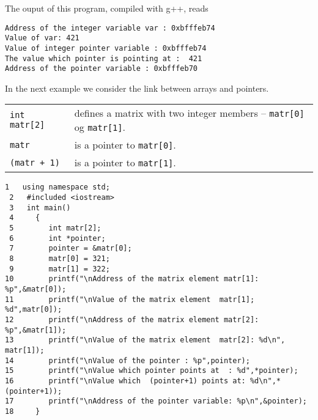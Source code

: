 %
The ouput of this program, compiled with g++, reads
\begin{svgraybox}
\begin{verbatim}
Address of the integer variable var : 0xbfffeb74
Value of var: 421
Value of integer pointer variable : 0xbfffeb74
The value which pointer is pointing at :  421
Address of the pointer variable : 0xbfffeb70
\end{verbatim}
\end{svgraybox}
In the next example we consider the link between arrays and pointers.
\begin{center}
\begin{tabular}{ll}
\begin{minipage}[t]{0.2\textwidth}
\tt int matr[2]
\vspace*{2mm}
\end{minipage}
&
\begin{minipage}[t]{0.7\textwidth}
defines a matrix with two integer members
-- {\tt matr[0]} og {\tt matr[1]}.
\end{minipage}\\[1ex]
\begin{minipage}[t]{0.2\textwidth}
\tt matr
\end{minipage}
&
\begin{minipage}[t]{0.7\textwidth}
is a pointer to {\tt matr[0]}.
\end{minipage}\\[1ex]
%
\begin{minipage}[t]{0.2\textwidth}
\tt (matr + 1)
\end{minipage}
&
\begin{minipage}[t]{0.7\textwidth}
is a pointer to {\tt matr[1]}.
\end{minipage}\\
\end{tabular}
\end{center}
\begin{lstlisting}[title={\url{http://folk.uio.no/mhjensen/compphys/programs/chapter02/cpp/program8.cpp}}]
 1   using namespace std;
 2   #included <iostream>
 3   int main()  
 4     {   
 5        int matr[2];  
 6        int *pointer;  
 7        pointer = &matr[0];  
 8        matr[0] = 321;  
 9        matr[1] = 322;  
10        printf("\nAddress of the matrix element matr[1]: %p",&matr[0]);
11        printf("\nValue of the matrix element  matr[1]; %d",matr[0]);
12        printf("\nAddress of the matrix element matr[2]: %p",&matr[1]);
13        printf("\nValue of the matrix element  matr[2]: %d\n", matr[1]);
14        printf("\nValue of the pointer : %p",pointer);
15        printf("\nValue which pointer points at  : %d",*pointer);
16        printf("\nValue which  (pointer+1) points at: %d\n",*(pointer+1));
17        printf("\nAddress of the pointer variable: %p\n",&pointer);
18     }
\end{lstlisting}
